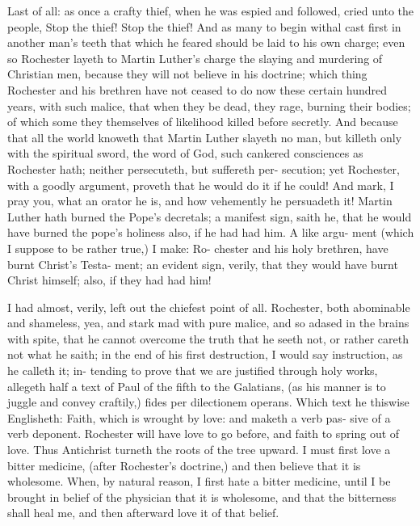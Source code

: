 \documentclass{custom}
\begin{document}
Last of all: as once a crafty thief, when he was espied 
and followed, cried unto the people, Stop the thief! Stop 
the thief! And as many to begin withal cast first in another 
man's teeth that which he feared should be laid to his own 
charge; even so Rochester layeth to Martin Luther's 
charge the slaying and murdering of Christian men, 
because they will not believe in his doctrine; which thing 
Rochester and his brethren have not ceased to do now 
these certain hundred years, with such malice, that when 
they be dead, they rage, burning their bodies; of which 
some they themselves of likelihood killed before secretly. 
And because that all the world knoweth that Martin 
Luther slayeth no man, but killeth only with the spiritual 
sword, the word of God, such cankered consciences as 
Rochester hath; neither persecuteth, but suffereth per- 
secution; yet Rochester, with a goodly argument, proveth 
that he would do it if he could! And mark, I pray you, 
what an orator he is, and how vehemently he persuadeth 
it! Martin Luther hath burned the Pope's decretals; a 
manifest sign, saith he, that he would have burned the 
pope's holiness also, if he had had him. A like argu- 
ment (which I suppose to be rather true,) I make: Ro- 
chester and his holy brethren, have burnt Christ's Testa- 
ment; an evident sign, verily, that they would have burnt 
Christ himself; also, if they had had him! 

I had almost, verily, left out the chiefest point of all. 
Rochester, both abominable and shameless, yea, and stark 
mad with pure malice, and so adased in the brains with 
spite, that he cannot overcome the truth that he seeth not, 
or rather careth not what he saith; in the end of his first 
destruction, I would say instruction, as he calleth it; in- 
tending to prove that we are justified through holy works, 
allegeth half a text of Paul of the fifth to the Galatians, 
(as his manner is to juggle and convey craftily,) fides per 
dilectionem operans. Which text he thiswise Englisheth: 
Faith, which is wrought by love: and maketh a verb pas- 
sive of a verb deponent. Rochester will have love to go 
before, and faith to spring out of love. Thus Antichrist 
turneth the roots of the tree upward. I must first love a 
bitter medicine, (after Rochester's doctrine,) and then 
believe that it is wholesome. When, by natural reason, I 
first hate a bitter medicine, until I be brought in belief of 
the physician that it is wholesome, and that the bitterness 
shall heal me, and then afterward love it of that belief. 
\end{document}

